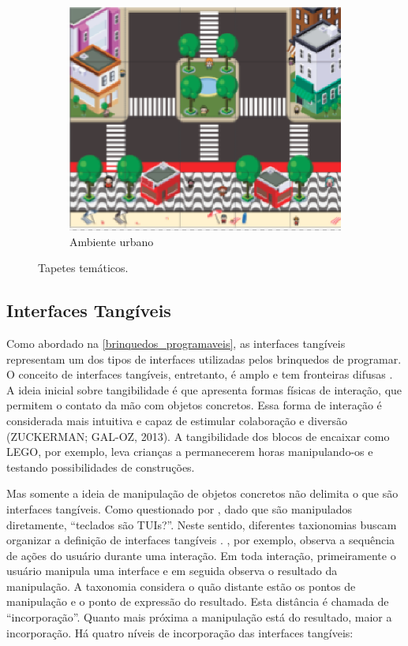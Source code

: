 \begin{figure}[!htbp]
\begin{subfigure}{.33\textwidth}
        \centering
        \includegraphics[width=.9\linewidth,fbox]{figs/tapete_city.png}
        \caption{Ambiente urbano}
        \label{tapete_city}
    \end{subfigure}
    \caption{Tapetes temáticos.}
    \sourceauthor
    \label{rope_mats}
\end{figure}

\subsection{Interfaces Tangíveis}
\label{fundamentacao_sub_interfaces_tangiveis}
Como abordado na \autoref{brinquedos_programaveis}, as interfaces tangíveis representam um dos tipos de interfaces utilizadas pelos brinquedos de programar. O conceito de interfaces tangíveis, entretanto, é amplo e tem fronteiras difusas \cite{falcao_design_2007}. A ideia inicial sobre tangibilidade é que apresenta formas físicas de interação, que permitem o contato da mão com objetos concretos. Essa forma de interação é considerada mais intuitiva e capaz de estimular colaboração e diversão (ZUCKERMAN; GAL-OZ, 2013). A tangibilidade dos blocos de encaixar como LEGO, por exemplo, leva crianças a permanecerem horas manipulando-os e testando possibilidades de construções.

Mas somente a ideia de manipulação de objetos concretos não delimita o que são interfaces tangíveis. Como questionado por , dado que são manipulados diretamente, “teclados são TUIs?”. Neste sentido, diferentes taxionomias buscam organizar a definição de interfaces tangíveis \cite{fishkin_taxonomy_2004, fincher_tangible_2019}. , por exemplo, observa a sequência de ações do usuário durante uma interação. Em toda interação, primeiramente o usuário manipula uma interface e em seguida observa o resultado da manipulação. A taxonomia considera o quão distante estão os pontos de manipulação e o ponto de expressão do resultado. Esta distância é chamada de “incorporação”. Quanto mais próxima a manipulação está do resultado, maior a incorporação. Há quatro níveis de incorporação das interfaces tangíveis:

